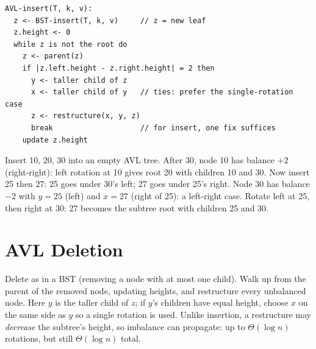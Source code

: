 \begin{lstlisting}
AVL-insert(T, k, v):
  z <- BST-insert(T, k, v)     // z = new leaf
  z.height <- 0
  while z is not the root do
    z <- parent(z)
    if |z.left.height - z.right.height| = 2 then
      y <- taller child of z
      x <- taller child of y   // ties: prefer the single-rotation case
      z <- restructure(x, y, z)
      break                    // for insert, one fix suffices
    update z.height
\end{lstlisting}

\begin{example}
Insert 10, 20, 30 into an empty AVL tree. After 30, node 10 has balance $+2$
(right-right): left rotation at 10 gives root 20 with children 10 and 30. Now
insert 25 then 27: 25 goes under 30's left; 27 goes under 25's right. Node 30
has balance $-2$ with $y = 25$ (left) and $x = 27$ (right of 25): a left-right
case. Rotate left at 25, then right at 30: 27 becomes the subtree root with
children 25 and 30.
\begin{center}
\end{center}
\end{example}

\section{AVL Deletion}

Delete as in a BST (removing a node with at most one child). Walk up from the
parent of the removed node, updating heights, and restructure every unbalanced
node. Here $y$ is the taller child of $z$; if $y$'s children have equal height,
choose $x$ on the same side as $y$ so a single rotation is used. Unlike insertion,
a restructure may \emph{decrease} the subtree's height, so imbalance can
propagate: up to $\Theta(\log n)$ rotations, but still $\Theta(\log n)$ total.

